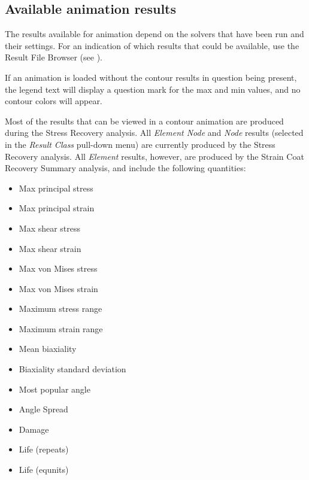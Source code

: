 \begin{bulletlist}
\end{bulletlist}



\subsection{Available animation results}

The results available for animation depend on the solvers that have been run and
their settings. For an indication of which results that could be available,
use the Result File Browser
(see ).


If an animation is loaded without the contour results in question being present,
the legend text will display a question mark for the max and min values,
and no contour colors will appear.

Most of the results that can be viewed in a contour animation are produced
during the Stress Recovery analysis. All {\sl Element Node} and {\sl Node}
results (selected in the {\sl Result Class} pull-down menu) are currently
produced by the Stress Recovery analysis. All {\sl Element} results, however,
are produced by the Strain Coat Recovery Summary analysis,
and include the following quantities:

\begin{itemize}
\item Max principal stress
\item Max principal strain
\item Max shear stress
\item Max shear strain
\item Max von Mises stress
\item Max von Mises strain
\item Maximum stress range
\item Maximum strain range
\item Mean biaxiality
\item Biaxiality standard deviation
\item Most popular angle
\item Angle Spread
\item Damage
\item Life (repeats)
\item Life (equnits)
\end{itemize}

